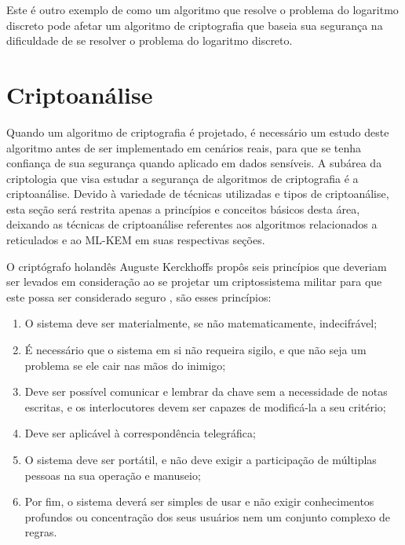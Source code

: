             Este é outro exemplo de como um algoritmo que resolve o problema do logaritmo discreto pode afetar um algoritmo de criptografia que baseia sua segurança na dificuldade de se resolver o problema do logaritmo discreto.

\section{Criptoanálise}
    Quando um algoritmo de criptografia é projetado, é necessário um estudo deste algoritmo antes de ser implementado em cenários reais, para que se tenha confiança de sua segurança quando aplicado em dados sensíveis. A subárea da criptologia que visa estudar a segurança de algoritmos de criptografia é a criptoanálise. Devido à variedade de técnicas utilizadas e tipos de criptoanálise, esta seção será restrita apenas a princípios e conceitos básicos desta área, deixando as técnicas de criptoanálise referentes aos algoritmos relacionados a reticulados e ao \ac{ML-KEM} em suas respectivas seções.

    O criptógrafo holandês Auguste Kerckhoffs propôs seis princípios que deveriam ser levados em consideração ao se projetar um criptossistema militar para que este possa ser considerado seguro \cite{kerckhoffs}, são esses princípios:

    \begin{enumerate}
        \item O sistema deve ser materialmente, se não matematicamente, indecifrável;
        \item É necessário que o sistema em si não requeira sigilo, e que não seja um problema se ele cair nas mãos do inimigo;
        \item Deve ser possível comunicar e lembrar da chave sem a necessidade de notas escritas, e os interlocutores devem ser capazes de modificá-la a seu critério;
        \item Deve ser aplicável à correspondência telegráfica;
        \item O sistema deve ser portátil, e não deve exigir a participação de múltiplas pessoas na sua operação e manuseio;
        \item Por fim, o sistema deverá ser simples de usar e não exigir conhecimentos profundos ou concentração dos seus usuários nem um conjunto complexo de regras.
    \end{enumerate}

